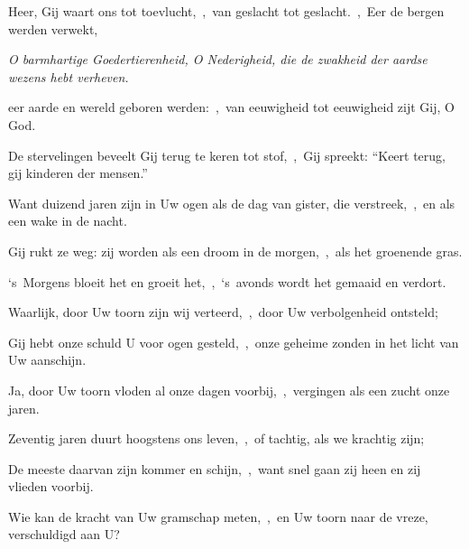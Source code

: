 \documentclass[12pt,twoside,a5paper]{article}
\begin{document}


\begin{halfparskip}

  Heer, Gij waart ons tot toevlucht,~\sep\ van geslacht tot geslacht.~\sep\ Eer de bergen werden verwekt,


  \liturgicallbracket{} \emph{O barmhartige Goedertierenheid, O Nederigheid, die de zwakheid der aardse wezens hebt verheven.}\liturgicalrbracket

  eer aarde en wereld geboren werden:~\sep\ van eeuwigheid tot eeuwigheid zijt Gij, O God.

  De stervelingen beveelt Gij terug te keren tot stof,~\sep\ Gij spreekt: ``Keert terug, gij kinderen der mensen.''

  Want duizend jaren zijn in Uw ogen als de dag van gister, die verstreek,~\sep\ en als een wake in de nacht.

  Gij rukt ze weg: zij worden als een droom in de morgen,~\sep\ als het groenende gras.

  `s~Morgens bloeit het en groeit het,~\sep\ `s~avonds wordt het gemaaid en verdort.
\end{halfparskip}

\begin{halfparskip}

  Waarlijk, door Uw toorn zijn wij verteerd,~\sep\ door Uw verbolgenheid ontsteld;

  Gij hebt onze schuld U voor ogen gesteld,~\sep\ onze geheime zonden in het licht van Uw aanschijn.

  Ja, door Uw toorn vloden al onze dagen voorbij,~\sep\ vergingen als een zucht onze jaren.

  Zeventig jaren duurt hoogstens ons leven,~\sep\ of tachtig, als we krachtig zijn;

  De meeste daarvan zijn kommer en schijn,~\sep\ want snel gaan zij heen en zij vlieden voorbij.

  Wie kan de kracht van Uw gramschap meten,~\sep\ en Uw toorn naar de vreze, verschuldigd aan U?
\end{halfparskip}
\end{document}

